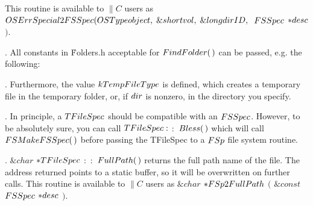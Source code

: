 This routine is available to \CD{}$\|C$\DC{} users as
\CD{}$\\{OSErr}\ \\{Special2FSSpec}(\\{OSType}\ \\{object},\;\&{short}\ %
\\{vol},\;\&{long}\ \\{dirID},\;$ $\\{FSSpec}$ ${{*}}\\{desc}$ $)$\DC{}.

\fi

. All constants in \.{Folders.h} acceptable
for \CD{}$\\{FindFolder}(\,)$\DC{} can be passed, e.g. the following:
\medskip{}

\fi

. Furthermore, the value \CD{}$\\{kTempFileType}$\DC{} is defined, which
creates a temporary
file in the temporary folder, or, if \CD{}$\\{dir}$\DC{} is nonzero, in the
directory you
specify.

\fi

. In principle, a \CD{}$\\{TFileSpec}$\DC{} should be compatible with an %
\CD{}$\\{FSSpec}$\DC{}. However, to
be absolutely sure, you can call \CD{}$\\{TFileSpec}:$ $:$ $\\{Bless}(\,)$\DC{}
which will call
\CD{}$\\{FSMakeFSSpec}(\,)$\DC{} before passing the TFileSpec to a \CD{}$%
\\{FSp}$\DC{} file system routine.

\fi

. \CD{}$\&{char}$ ${{*}}\\{TFileSpec}$ $:$ $:$ $\\{FullPath}(\,)$\DC{}
returns the full path name of the file. The
address returned points to a static buffer, so it will be overwritten on
further calls.
This routine is available to \CD{}$\|C$\DC{} users as
\CD{}$\&{char}$ ${{*}}\\{FSp2FullPath}$ $($ $\&{const}$ $\\{FSSpec}$ ${{*}}%
\\{desc}$ $)$\DC{}.

